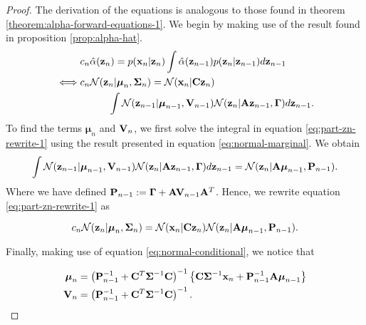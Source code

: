 \documentclass[11pt]{article}
\numberwithin{equation}{section}
\newcommand{\x}{{\bf x}}
\newcommand{\z}{{\bf z}}
\begin{document}
\begin{proof}
	The derivation of the equations is analogous to those found in theorem \ref{theorem:alpha-forward-equations-1}. We begin by making use of the result found in proposition \ref{prop:alpha-hat}. 
	\begin{align}
		&c_n \hat\alpha(\z_n) = p(\x_n\vert\z_n) \int \hat\alpha(\z_{n-1})p(\z_n \vert \z_{n-1}) d\z_{n-1}\\
		\iff& c_n \mathcal{N}(\z_n \vert \boldsymbol\mu_n, \boldsymbol\Sigma_n) = \mathcal{N}(\x_n \vert {\bf C}\z_n) \nonumber \\
			&\hspace{1cm} \int \mathcal{N}(\z_{n-1} \vert \boldsymbol\mu_{n-1}, {\bf V}_{n-1}) \mathcal{N}(\z_n \vert {\bf A}\z_{n-1}, \boldsymbol\Gamma) d\z_{n-1} \label{eq:part-zn-rewrite-1}.
	\end{align}
	To find the terms $\boldsymbol\mu_n$ and ${\bf V}_n$, we first solve the integral in equation \ref{eq:part-zn-rewrite-1} using the result presented in equation \ref{eq:normal-marginal}. We obtain
	\begin{equation}
		\int \mathcal{N}(\z_{n-1} \vert \boldsymbol\mu_{n-1}, {\bf V}_{n-1}) \mathcal{N}(\z_n \vert {\bf A}\z_{n-1}, \boldsymbol\Gamma) d\z_{n-1} = \mathcal{N}(\z_n \vert {\bf A} \boldsymbol\mu_{n-1}, {\bf P}_{n-1}).
	\end{equation}
	Where we have defined ${\bf P}_{n-1} := \boldsymbol\Gamma + {\bf A}{\bf V}_{n-1}{\bf A}^T$. Hence, we rewrite equation \ref{eq:part-zn-rewrite-1} as 
	
	\begin{equation}
		c_n \mathcal{N}(\z_n \vert \boldsymbol\mu_n, \boldsymbol\Sigma_n) = \mathcal{N}(\x_n \vert {\bf C}\z_n)  \mathcal{N}(\z_n \vert {\bf A} \boldsymbol\mu_{n-1}, {\bf P}_{n-1}).
	\end{equation}
	
	Finally, making use of equation \ref{eq:normal-conditional}, we notice that
	
	\begin{align}
		\boldsymbol{\mu}_n &= \left({\bf P}_{n-1}^{-1} + {\bf C}^T \boldsymbol\Sigma^{-1}{\bf C}\right)^{-1} \left\{{\bf C}\boldsymbol\Sigma^{-1}\x_n + {\bf P}_{n-1}^{-1}{\bf A}\boldsymbol\mu_{n-1}\right\}\\
		{\bf V}_n &= \left({\bf P}_{n-1}^{-1} + {\bf C}^T \boldsymbol\Sigma^{-1}{\bf C}\right)^{-1}.
	\end{align}
	

\end{proof}
\end{document}
